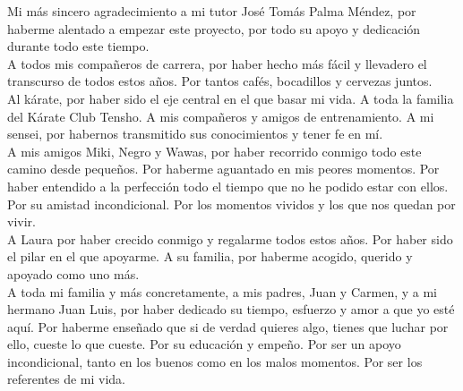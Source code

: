 Mi más sincero agradecimiento a mi tutor José Tomás Palma Méndez, por haberme alentado a empezar este proyecto, por todo su apoyo y dedicación durante todo este tiempo. \\

A todos mis compañeros de carrera, por haber hecho más fácil y llevadero el transcurso de todos estos años. Por tantos cafés, bocadillos y cervezas juntos. \\

Al kárate, por haber sido el eje central en el que basar mi vida. A toda la familia del Kárate Club Tensho. A mis compañeros y amigos de entrenamiento. A mi sensei, por habernos transmitido sus conocimientos y tener fe en mí. \\

A mis amigos Miki, Negro y Wawas, por haber recorrido conmigo todo este camino desde pequeños. Por haberme aguantado en mis peores momentos. Por haber entendido a la perfección todo el tiempo que no he podido estar con ellos. Por su amistad incondicional. Por los momentos vividos y los que nos quedan por vivir. \\

A Laura por haber crecido conmigo y regalarme todos estos años. Por haber sido el pilar en el que apoyarme. A su familia, por haberme acogido, querido y apoyado como uno más. \\

A toda mi familia y más concretamente, a mis padres, Juan y Carmen, y a mi hermano Juan Luis, por haber dedicado su tiempo, esfuerzo y amor a que yo esté aquí. Por haberme enseñado que si de verdad quieres algo, tienes que luchar por ello, cueste lo que cueste. Por su educación y empeño. Por ser un apoyo incondicional, tanto en los buenos como en los malos momentos. Por ser los referentes de mi vida. 


